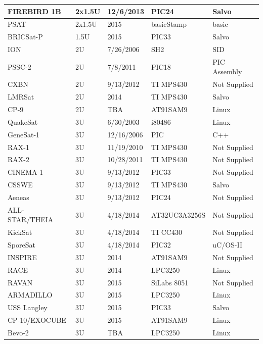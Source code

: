 \documentclass[11pt]{article}
\begin{document}
\begin{center}
\begin{longtable}{|l|l|l|l|l|}
FIREBIRD 1B & 2x1.5U & 12/6/2013 & PIC24 & Salvo \\ \hline
PSAT & 2x1.5U & 2015 & basicStamp & basic \\ \hline
BRICSat-P & 1.5U & 2015 & PIC33 & Salvo \\ \hline
ION & 2U & 7/26/2006 & SH2 & SID \\ \hline
PSSC-2 & 2U & 7/8/2011 & PIC18 & PIC Assembly \\ \hline
CXBN & 2U & 9/13/2012 & TI MPS430 & Not Supplied \\ \hline
LMRSat & 2U & 2014 & TI MPS430 & Salvo \\ \hline
CP-9 & 2U & TBA & AT91SAM9 & Linux \\ \hline
QuakeSat & 3U & 6/30/2003 & i80486 & Linux \\ \hline
GeneSat-1 & 3U & 12/16/2006 & PIC & C++ \\ \hline
RAX-1 & 3U & 11/19/2010 & TI MPS430 & Not Supplied \\ \hline
RAX-2 & 3U & 10/28/2011 & TI MPS430 & Not Supplied \\ \hline
CINEMA 1 & 3U & 9/13/2012 & PIC33 & Not Supplied \\ \hline
CSSWE & 3U & 9/13/2012 & TI MPS430 & Salvo \\ \hline
Aeneas & 3U & 9/13/2012 & PIC24 & Not Supplied \\ \hline
ALL-STAR/THEIA & 3U & 4/18/2014 & AT32UC3A3256S & Not Supplied \\ \hline
KickSat & 3U & 4/18/2014 & TI CC430 & Not Supplied \\ \hline
SporeSat & 3U & 4/18/2014 & PIC32 & uC/OS-II \\ \hline
INSPIRE & 3U & 2014 & AT91SAM9 & Not Supplied \\ \hline
RACE & 3U & 2014 & LPC3250 & Linux \\ \hline
RAVAN & 3U & 2015 & SiLabs 8051 & Not Supplied \\ \hline
ARMADILLO & 3U & 2015 & LPC3250 & Linux \\ \hline
USS Langley & 3U & 2015 & PIC33 & Salvo \\ \hline
CP-10/EXOCUBE & 3U & 2015 & AT91SAM9 & Linux \\ \hline
Bevo-2 & 3U & TBA & LPC3250 & Linux \\ \hline
\end{longtable}
\end{center}



\end{document}
